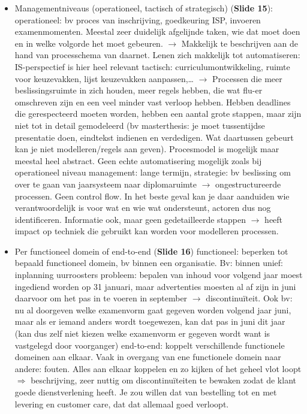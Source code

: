 \documentclass[10pt,a4paper]{report}
\begin{document}
\begin{itemize}
\item Managementniveaus (operationeel, tactisch of strategisch) (\textbf{Slide 15}): operationeel: bv proces van inschrijving, goedkeuring ISP, invoeren examenmomenten. Meestal zeer duidelijk afgelijnde taken, wie dat moet doen en in welke volgorde het moet gebeuren. $\rightarrow$ Makkelijk te beschrijven aan de hand van processchema van daarnet. Lenen zich makkelijk tot automatiseren: IS-perspectief is hier heel relevant tactisch: curriculumontwikkeling, ruimte voor keuzevakken, lijst keuzevakken aanpassen,… $\rightarrow$ Processen die meer beslissingsruimte in zich houden, meer regels hebben, die wat flu-er omschreven zijn en een veel minder vast verloop hebben. Hebben deadlines die gerespecteerd moeten worden, hebben een aantal grote stappen, maar zijn niet tot in detail gemodeleerd (bv masterthesis: je moet tussentijdse presentatie doen, eindtekst indienen en verdedigen. Wat daartussen gebeurt kan je niet modelleren/regels aan geven). Procesmodel is mogelijk maar meestal heel abstract. Geen echte automatisering mogelijk zoals bij operationeel niveau management: lange termijn, strategie: bv beslissing om over te gaan van jaarsysteem naar diplomaruimte $\rightarrow$ ongestructureerde processen. Geen control flow. In het beste geval kan je daar aanduiden wie verantwoordelijk is voor wat en wie wat ondersteunt, actoren dus nog identificeren. Informatie ook, maar geen gedetailleerde stappen $\rightarrow$ heeft impact op techniek die gebruikt kan worden voor modelleren processen.
\item Per functioneel domein of end-to-end (\textbf{Slide 16}) functioneel: beperken tot bepaald functioneel domein, bv binnen een organisatie. Bv: binnen unief: inplanning uurroosters probleem: bepalen van inhoud voor volgend jaar moest ingediend worden op 31 januari, maar advertenties moesten al af zijn in juni daarvoor om het pas in te voeren in september $\rightarrow$ discontinuïteit. Ook bv: nu al doorgeven welke examenvorm gaat gegeven worden volgend jaar juni, maar als er iemand anders wordt toegewezen, kan dat pas in juni dit jaar (kan dus zelf niet kiezen welke examenvorm er gegeven wordt want is vastgelegd door voorganger) end-to-end: koppelt verschillende functionele domeinen aan elkaar. Vaak in overgang van ene functionele domein naar andere: fouten. Alles aan elkaar koppelen en zo kijken of het geheel vlot loopt $\Rightarrow$ beschrijving, zeer nuttig om discontinuïteiten te bewaken zodat de klant goede dienstverlening heeft. Je zou willen dat van bestelling tot en met levering en customer care, dat dat allemaal goed verloopt.
\end{itemize}
\end{document}
